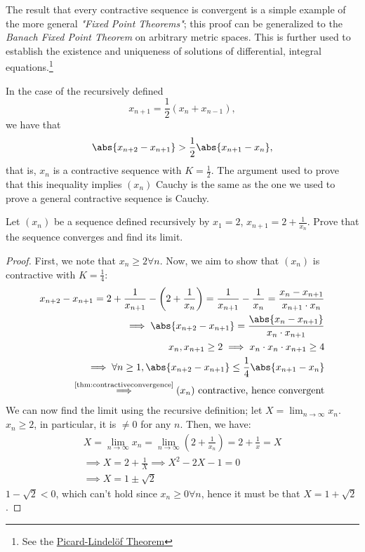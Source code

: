 \documentclass[12pt]{article}
\begin{document}
\begin{remark}
  The result that every contractive sequence is convergent is a simple example of the more general \emph{"Fixed Point Theorems"}; this proof can be generalized to the \emph{Banach Fixed Point Theorem} on arbitrary metric spaces. This is further used to establish the existence and uniqueness of solutions of differential, integral equations.\footnote{See the \href{https://en.wikipedia.org/wiki/Picard-Lindelöf theorem}{Picard-Lindelöf Theorem}}
\end{remark}

\begin{remark}
  In the case of the recursively defined \[x_{n+1} = \frac{1}{2}(x_n + x_{n-1}),\] we have that \[
  \abs{x_{n+2} - x_{n+1}}  > \frac{1}{2}\abs{x_{n+1} - x_n},
  \]
  that is, $x_n$ is a contractive sequence with $K = \frac{1}{2}$. The argument used to prove that this inequality implies $(x_n)$ Cauchy is the same as the one we used to prove a general contractive sequence is Cauchy.
\end{remark}

\begin{example}
  Let $(x_n)$ be a sequence defined recursively by $x_1 = 2$, $x_{n+1} = 2 + \frac{1}{x_n}$. Prove that the sequence converges and find its limit.


\begin{proof}
  First, we note that $x_n \geq 2 \forall n$. Now, we aim to show that $(x_n)$ is contractive with $K = \frac{1}{4}$:\begin{align*}
    x_{n+2} - x_{n+1} = 2 + \frac{1}{x_{n+1}} - \left( 2 + \frac{1}{x_n}\right) = \frac{1}{x_{n+1}} - \frac{1}{x_n} = \frac{x_{n} - x_{n+1}}{x_{n+1} \cdot x_n}\\
    \implies \abs{x_{n+2} - x_{n+1}} = \frac{\abs{x_n - x_{n+1}}}{x_n \cdot x_{n+1}}\\
    x_{n}, x_{n+1} \geq 2 \implies x_{n} \cdot x_n \cdot x_{n+1} \geq 4\\
    \implies \forall n \geq 1, \abs{x_{n+2} - x_{n+1}} \leq \frac{1}{4} \abs{x_{n+1} - x_n}\\
    \overset{\text{\cref{thm:contractiveconvergence}}}{\implies} (x_n) \text{ contractive, hence convergent}
  \end{align*}
  We can now find the limit using the recursive definition; let  $X = \lim_{n\to\infty} x_n$. $x_n \geq 2$, in particular, it is $\neq 0$ for any $n$. Then, we have:
  \begin{align*}
   X = \lim_{n\to\infty} x_n =  \lim_{n\to\infty} \left(2 + \frac{1}{x_n}\right) = 2 + \frac{1}{x} = X\\
    \implies X = 2+\frac{1}{X} \implies X^2 - 2X - 1 = 0\\
    \implies X = 1 \pm \sqrt{2}
\end{align*}
$1 - \sqrt{2} < 0$, which can't hold since $x_n \geq 0 \forall n$, hence it must be that $X = 1 + \sqrt{2}$.
\end{proof}
\end{example}
\end{document}
